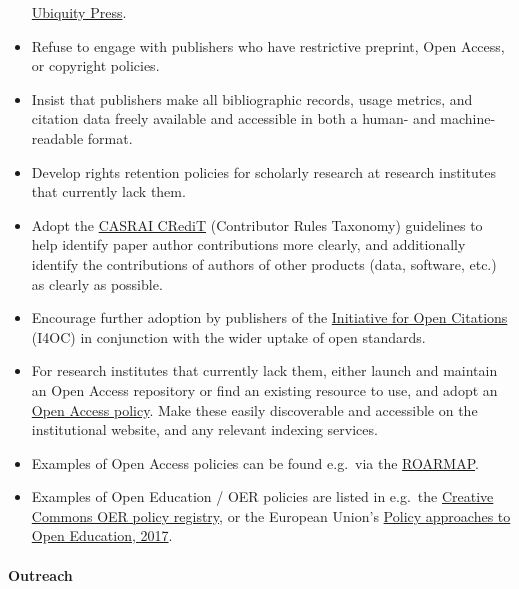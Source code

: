 \begin{itemize}
  \href{https://www.ubiquitypress.com/site/publish/}{Ubiquity Press}.
\item
  Refuse to engage with publishers who have restrictive preprint, Open
  Access, or copyright policies.
\item
  Insist that publishers make all bibliographic records, usage metrics,
  and citation data freely available and accessible in both a human- and
  machine-readable format.
\item
  Develop rights retention policies for scholarly research at research
  institutes that currently lack them.
\item
  Adopt the \href{http://docs.casrai.org/CRediT}{CASRAI CRediT}
  (Contributor Rules Taxonomy) guidelines to help identify paper author
  contributions more clearly, and additionally identify the
  contributions of authors of other products (data, software, etc.) as
  clearly as possible.
\item
  Encourage further adoption by publishers of the
  \href{https://i4oc.org/}{Initiative for Open Citations} (I4OC) in
  conjunction with the wider uptake of open standards.
\item
  For research institutes that currently lack them, either launch and
  maintain an Open Access repository or find an existing resource to
  use, and adopt an
  \href{https://cyber.harvard.edu/hoap/Good_practices_for_university_open-access_policies}{Open
  Access policy}. Make these easily discoverable and accessible on the
  institutional website, and any relevant indexing services.
\item
  Examples of Open Access policies can be found e.g.~via the
  \href{https://roarmap.eprints.org/cgi/search/advanced}{ROARMAP}.
\item
  Examples of Open Education / OER policies are listed in e.g.~the
  \href{https://wiki.creativecommons.org/wiki/OER_Policy_Registry}{Creative
  Commons OER policy registry}, or the European Union's
  \href{https://doi.org/10.2760/283135}{Policy approaches to Open
  Education, 2017}.
\end{itemize}

\paragraph{Outreach}\label{outreach-2}

